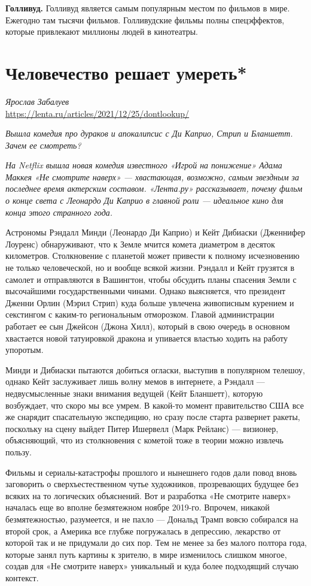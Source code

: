 \textbf{Голливуд.}
Голливуд является самым популярным местом по  фильмов в мире. Ежегодно там  тысячи фильмов. Голливудские фильмы полны спецэффектов, которые привлекают миллионы людей в кинотеатры.

\section{Человечество решает умереть*}
\textit{Ярослав Забалуев}\\
\url{https://lenta.ru/articles/2021/12/25/dontlookup/}

{\it Вышла комедия про дураков и апокалипсис с Ди Каприо, Стрип и Бланшетт. Зачем ее смотреть?}

\textit{На Netflix вышла новая комедия известного «Игрой на понижение» Адама Маккея «Не смотрите наверх» --- хвастающая, возможно, самым звездным за последнее время актерским составом. «Лента.ру» рассказывает, почему фильм о конце света с Леонардо Ди Каприо в главной роли --- идеальное кино для конца этого странного года.}

Астрономы Рэндалл Минди (Леонардо Ди Каприо) и Кейт Дибиаски (Дженнифер Лоуренс) обнаруживают, что к Земле мчится комета диаметром в десяток километров. Столкновение с планетой может привести к полному исчезновению не только человеческой, но и вообще всякой жизни. Рэндалл и Кейт грузятся в самолет и отправляются в Вашингтон, чтобы обсудить планы спасения Земли с высочайшими государственными чинами. Однако выясняется, что президент Дженни Орлин (Мэрил Стрип) куда больше увлечена живописным курением и секстингом с каким-то региональным отморозком. Главой администрации работает ее сын Джейсон (Джона Хилл), который в свою очередь в основном хвастается новой татуировкой дракона и упивается властью ходить на работу упоротым.

Минди и Дибиаски пытаются добиться огласки, выступив в популярном телешоу, однако Кейт заслуживает лишь волну мемов в интернете, а Рэндалл --- недвусмысленные знаки внимания ведущей (Кейт Бланшетт), которую возбуждает, что скоро мы все умрем. В какой-то момент правительство США все же снарядит спасательную экспедицию, но сразу после старта развернет ракеты, поскольку на сцену выйдет Питер Ишервелл (Марк Рейланс) --- визионер, объясняющий, что из столкновения с кометой тоже в теории можно извлечь пользу.

Фильмы и сериалы-катастрофы прошлого и нынешнего годов дали повод вновь заговорить о сверхъестественном чутье художников, прозревающих будущее без всяких на то логических объяснений. Вот и разработка «Не смотрите наверх» началась еще во вполне безмятежном ноябре 2019-го. Впрочем, никакой безмятежностью, разумеется, и не пахло --- Дональд Трамп вовсю собирался на второй срок, а Америка все глубже погружалась в депрессию, лекарство от которой так и не придумали до сих пор. Тем не менее за без малого полтора года, которые занял путь картины к зрителю, в мире изменилось слишком многое, создав для «Не смотрите наверх» уникальный и куда более подходящий случаю контекст.

